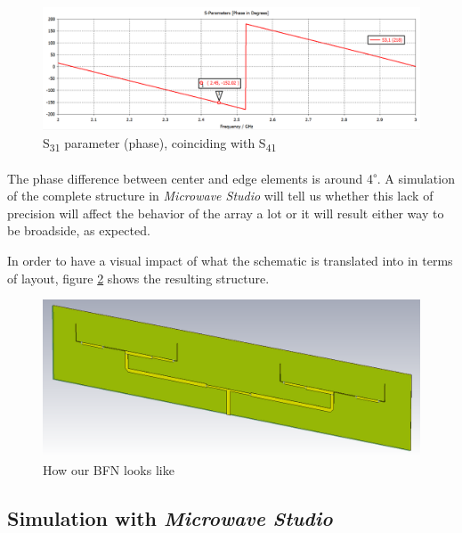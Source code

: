 \begin{figure}[H]
\centering
\includegraphics[scale=0.35]{S31p.png}
\caption{S\textsubscript{31} parameter (phase), coinciding with S\textsubscript{41}}
\label{S31phase}
\end{figure}

\par\medskip
\noindent
The phase difference between center and edge elements is around 4\textsuperscript{$\circ$}. A simulation of the complete structure in \textit{Microwave Studio} will tell us whether this lack of precision will affect the behavior of the array a lot or it will result either way to be broadside, as expected.

\par\medskip
\noindent
In order to have a visual impact of what the schematic is translated into in terms of layout, figure \ref{layout} shows the resulting structure.

\begin{figure}[H]
\centering
\includegraphics[scale=0.45]{layout.png}
\caption{How our BFN looks like}
\label{layout}
\end{figure}

\subsection{Simulation with \textit{Microwave Studio}}

